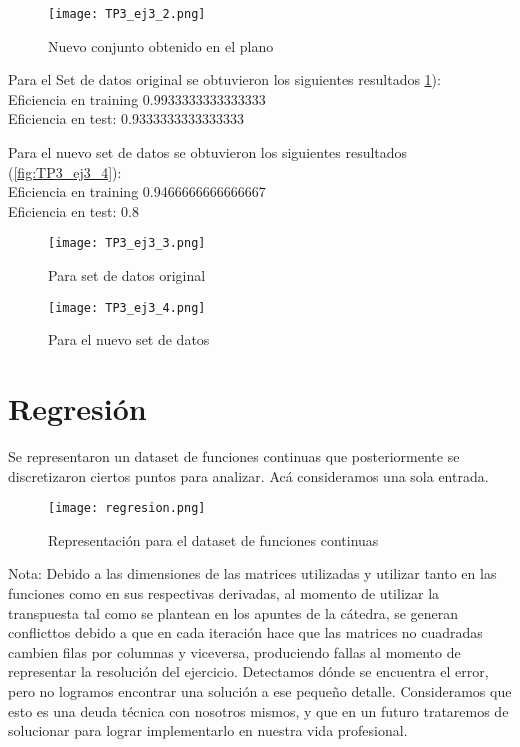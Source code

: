 \documentclass{article}
\begin{document}
\begin{figure}[ht]
    \centering
    \texttt{[image: TP3\_ej3\_2.png]}
    \caption{Nuevo conjunto obtenido en el plano}
    \label{fig:TP3_ej3_2}
\end{figure}

Para el Set de datos original se obtuvieron los siguientes resultados \ref{fig:TP3_ej3_2}):\\
Eficiencia en training 0.9933333333333333\\
Eficiencia en test:  0.9333333333333333


Para el nuevo set de datos se obtuvieron los siguientes resultados (\ref{fig:TP3_ej3_4}):\\
Eficiencia en training 0.9466666666666667\\
Eficiencia en test:  0.8
\begin{figure*}[h!]
    \centering
    \begin{subfigure}[b]{0.475\textwidth}
    \centering    
        \texttt{[image: TP3\_ej3\_3.png]}
        \caption[]
        \small{Para set de datos original}
    \end{subfigure}
    \hfill
    \begin{subfigure}[b]{0.475\textwidth}
        \centering
        \texttt{[image: TP3\_ej3\_4.png]}
        \caption[]
        \small{Para el nuevo set de datos}
    \end{subfigure}
    \label{fig:TP3_ej3_4}

\end{figure*}

\section{Regresión}
Se representaron un dataset de funciones continuas que posteriormente se discretizaron ciertos puntos para analizar. Acá consideramos una sola entrada.\\

\begin{figure}[ht]
    \centering
    \texttt{[image: regresion.png]}
    \caption{Representación para el dataset de funciones continuas}
    \label{fig:regresion}
\end{figure}

Nota: Debido a las dimensiones de las matrices utilizadas y utilizar tanto en las funciones como en sus respectivas derivadas, al momento de utilizar la transpuesta tal como se plantean en los apuntes de la cátedra, se generan conflicttos debido a que en cada iteración hace que las matrices no cuadradas cambien filas por columnas y viceversa, produciendo fallas al momento de representar la resolución del ejercicio. Detectamos dónde se encuentra el error, pero no logramos encontrar una solución a ese pequeño detalle. Consideramos que esto es una deuda técnica con nosotros mismos, y que en un futuro trataremos de solucionar para lograr implementarlo en nuestra vida profesional. 
\end{document}
